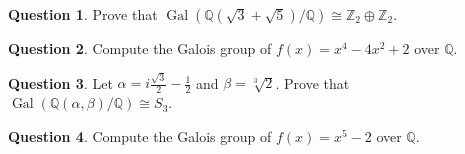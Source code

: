 \documentclass[11pt]{article}
\def\mbb{\mathbb}
\def\Q{\mbb{Q}}
\def\Z{\mbb{Z}}
\theoremstyle{pink}
\theoremstyle{boxedsolution}
\theoremstyle{definition}
\newtheorem{question}{Question}
\newtheorem{hquestion}{Hard Question}
\theoremstyle{claim}
\begin{document}
\begin{question}
Prove that $\operatorname{Gal}(\Q(\sqrt{3}+ \sqrt{5})/\Q) \cong \Z_2 \oplus \Z_2$. 
\end{question}

\begin{question}
Compute the Galois group of $f(x) = x^4-4x^2+2$ over $\Q$.
\end{question}

\begin{question}
Let $\alpha =  i\frac{\sqrt{3}}{2}-\frac{1}{2}$ and $\beta = \sqrt[3]{2}$. Prove that $\operatorname{Gal}(\Q(\alpha, \beta)/\Q) \cong S_3$.
\end{question}

\begin{question}
Compute the Galois group of $f(x) = x^5-2$ over $\Q$.
\end{question}


    

    

\end{document}
